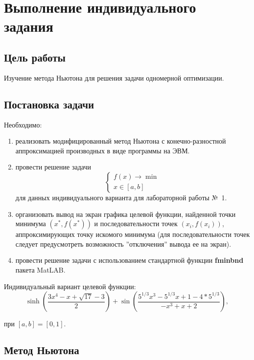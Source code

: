 \chapter{Выполнение индивидуального задания}

\section{Цель работы}

Изучение метода Ньютона для решения задачи одномерной оптимизации.

\section{Постановка задачи}

Необходимо:
\begin{enumerate}
\item реализовать модифицированный метод Ньютона с конечно-разностной аппроксимацией производных в виде программы на ЭВМ.
\item провести решение задачи
\begin{equation*}
\begin{cases}
f(x) \rightarrow \min \\
x \in [a, b]
\end{cases}
\end{equation*}
для данных индивидуального варианта для лабораторной работы №~1.
\item организовать вывод на экран графика целевой функции, найденной точки минимума $(x^* , f (x^*))$ и последовательности точек $(x_{i}, f(x_{i}))$, аппроксимирующих точку искомого минимума (для последовательности точек следует предусмотреть возможность ”отключения” вывода ее на экран).
\item провести решение задачи с использованием стандартной функции \textbf{fminbnd} пакета MatLAB.
\end{enumerate}

Индивидуальный вариант целевой функции:
\begin{equation*}
\sinh\left(\frac{3x^4 - x + \sqrt{17} - 3}{2}\right)+\sin\left(\frac{5^{1/3}x^3 - 5^{1/3}x + 1 - 4*5^{1/3}}{-x^3 + x + 2}\right),
\end{equation*}

при $[a, b] = [0, 1]$.

\newpage

\section*{Метод Ньютона}

